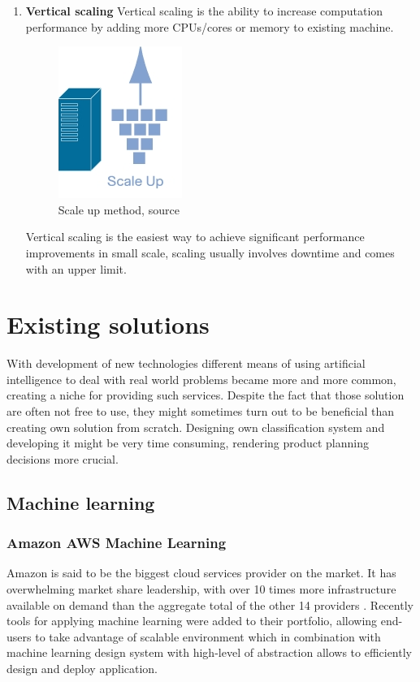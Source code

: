 \begin{enumerate}
		\item \textbf{Vertical scaling}
		Vertical scaling is the ability to increase computation performance by adding more CPUs/cores or memory to existing machine.
		
		\begin{figure}[H]
			\begin{center}
				\includegraphics[width=0.3\linewidth]{images/scaleup.png}
				\caption{Scale up method, source \cite{scale_out_up} }
				\label{svm-plot2}
			\end{center}
		\end{figure}
		
		Vertical scaling is the easiest way to achieve significant performance improvements in small scale, scaling usually involves downtime and comes with an upper limit.
	\end{enumerate}

\section{Existing solutions}
	With development of new technologies different means of using artificial intelligence to deal with real world problems became more and more common, creating a niche for providing such services. Despite the fact that those solution are often not free to use, they might sometimes turn out to be beneficial than creating own solution from scratch. Designing own classification system and developing it might be very time consuming, rendering product planning decisions more crucial.
	\subsection{Machine learning}
		
		\subsubsection{Amazon AWS Machine Learning}
		Amazon is said to be the biggest cloud services provider on the market. It has overwhelming market share leadership, with over 10 times more infrastructure available on demand than the aggregate total of the other 14 providers \cite{amazon_leader}. Recently tools for applying machine learning were added to their portfolio, allowing end-users to take advantage of scalable environment which in combination with machine learning design system with high-level of abstraction allows to efficiently design and deploy application. 
		
